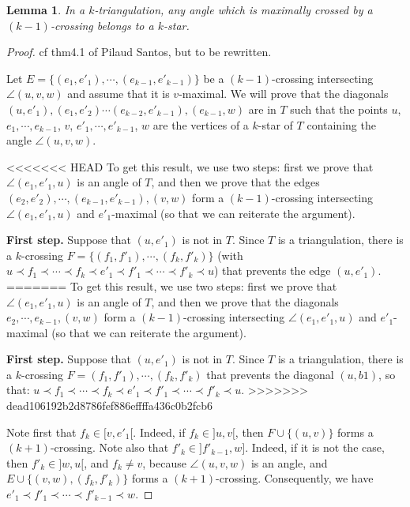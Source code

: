 \documentclass{amsart}
\newtheorem{lemma}[theorem]{Lemma}
\theoremstyle{remark}
\newcommand*{\ktg}[0]{$k$-triangulation\xspace}
\newcommand{\cl}{\prec}
\begin{document}
\begin{lemma}
In a \ktg, any angle which is maximally crossed by a $(k-1)$-crossing belongs to a $k$-star.
\end{lemma}
\begin{proof}
cf thm4.1 of  Pilaud Santos, but to be rewritten.





Let $E=\{(e_1,e'_1), \cdots , (e_{k-1},e'_{k-1})\}$ be a $(k - 1)$-crossing intersecting $\angle(u, v, w)$ and assume that it is $v$-maximal. 
We will prove that the diagonals $(u, e'_1),(e_1, e'_2)\cdots(e_{k-2}, e'_{k-1}), (e_{k-1}, w)$ are in $T$ such that the points $u$, $e_1,\cdots,e_{k-1}$, $v$, $e'_1,\cdots,e'_{k-1}$, $w$ are the vertices of a $k$-star of $T$ containing the angle $\angle(u, v, w)$. 

<<<<<<< HEAD
To get this result, we use two steps: first we prove that $\angle(e_1, e'_1, u)$ is an angle of $T$, and then we prove that the edges $(e_2,e'_2),\cdots, (e_{k-1},e'_{k-1}), (v, w)$ form a $(k-1)$-crossing intersecting $\angle(e_1, e'_1, u)$ and $e'_1$-maximal (so that we can reiterate the argument).

{\bf First step.}
Suppose that $(u, e'_1)$ is not in $T$. 
Since $T$ is a triangulation, there is a $k$-crossing $F=\{(f_1, f'_1),\cdots, (f_k, f'_k)\}$ (with $u \cl f_1 \cl \cdots \cl f_k \cl e'_1 \cl f'_1 \cl \cdots \cl f'_k \cl u$) that prevents the edge $(u, e'_1)$.
=======
To get this result, we use two steps: first we prove that $\angle(e_1, e'_1, u)$ is an angle of $T$, and then we prove that the diagonals $e_2,\cdots, e_{k-1}, (v, w)$ form a $(k-1)$-crossing intersecting $\angle(e_1, e'_1, u)$ and $e'_1$-maximal (so that we can reiterate the argument).

{\bf First step.}
Suppose that $(u, e'_1)$ is not in $T$. 
Since $T$ is a triangulation, there is a $k$-crossing $F=(f_1, f'_1),\cdots, (f_k, f'_k)$ that prevents the diagonal $(u, b1)$, so that: $u \cl f_1 \cl \cdots \cl f_k \cl e'_1 \cl f'_1 \cl \cdots \cl f'_k \cl u$.
>>>>>>> dead106192b2d8786fef886effffa436c0b2fcb6

Note first that $f_k \in [v,e'_1[$. Indeed, if $f_k \in ]u, v[$, then $F \cup \{(u, v)\}$ forms a $(k + 1)$-crossing.
Note also that $f'_k \in ]f'_{k-1},w]$. Indeed, if it is not the case, then $f'_k \in ]w, u[$, and $f_k \neq v$, because $\angle(u, v, w)$ is an angle, and $E \cup \{(v,w),(f_k, f'_k)\}$ forms a $(k + 1)$-crossing. 
Consequently, we have $e'_1 \cl f'_1 \cl \cdots \cl f'_{k-1} \cl w$.


\end{proof}
\end{document}
